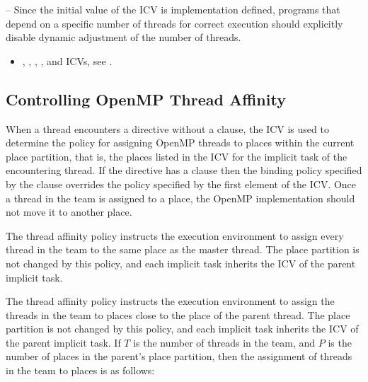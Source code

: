 \notestart
\noteheader – Since the initial value of the  ICV is implementation defined, programs 
that depend on a specific number of threads for correct execution should explicitly 
disable dynamic adjustment of the number of threads.
\noteend

\crossreferences
\begin{itemize}
\item {}, , , 
, and  ICVs, see 
.
\end{itemize}










\subsection{Controlling OpenMP Thread Affinity}
\label{subsec:Controlling OpenMP Thread Affinity}

When a thread encounters a  directive without a  clause, the  ICV is used to determine the policy for assigning OpenMP threads to places within the current place partition, that is, the places listed in the  ICV for the implicit task of the encountering thread. If the  directive has a  clause then the binding policy specified by the  clause overrides the policy specified by the first element of the  ICV. Once a thread in the team is assigned to a place, the OpenMP implementation should not move it to another place. 

The  thread affinity policy instructs the execution environment to assign every thread in the team to the same place as the master thread. The place partition is not changed by this policy, and each implicit task inherits the  ICV of the parent implicit task.

The  thread affinity policy instructs the execution environment to assign the threads in the team to places close to the place of the parent thread. The place partition is not changed by this policy, and each implicit task inherits the  ICV of the parent implicit task. If $T$ is the number of threads in the team, and $P$ is the number of places in the parent's place partition, then the assignment of threads in the team to places is as follows:

